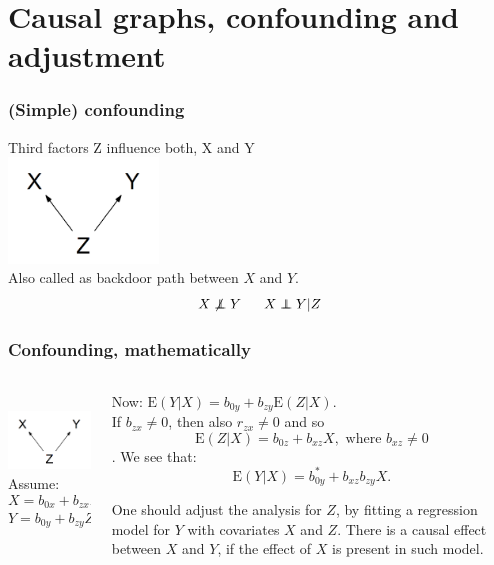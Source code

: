\documentclass[10pt,dvipsnames,t %
,aspectratio=169%
]{beamer}%
\newcommand{\E}{\mathrm{E}}
\newcommand{\indep}{\perp\!\!\!\!\perp}
\begin{document}
\section{Causal graphs, confounding and adjustment}


\begin{frame}
	\frametitle{(Simple) confounding}
	Third factors  Z influence both, X and Y \\
	\includegraphics[width=4cm]{conf1}\\
	Also called as \alert{backdoor path} between $X$ and $Y$. \\
	
$$X \not\indep Y \; \hspace{0.5cm}  X \indep Y|Z$$
	
\end{frame}

\begin{frame}
	\frametitle{Confounding, mathematically}
\begin{columns}
\begin{column}{5cm}
\mbox{ } \\
	\includegraphics[width=4cm]{conf1}
	\mbox{}\\[0.5cm]
Assume:
$$X= b_{0x} + b_{zx}Z + \varepsilon_x, \ \E(\varepsilon_x|Z)=0 $$  
$$ Y= b_{0y} + b_{zy}Z + \varepsilon_y, \ \E(\varepsilon_y|Z, X)=0. $$
\end{column}
\begin{column}{7cm}
Now: 
$\E(Y|X) = b_{0y} + b_{zy}\E(Z|X). $ \\[0.2cm]
If  $b_{zx} \ne 0$, then also  $r_{zx} \ne 0$ and so 
$$ \E(Z|X) =  b_{0z}+ b_{xz}X, \mbox{ where }b_{xz} \ne 0$$. 
We see that:
$$\E(Y|X) = b_{0y}^* + b_{xz}b_{zy}X. $$

\begin{block}{}\alert{One should adjust the analysis for $Z$, by fitting a regression model for $Y$ with covariates
	$X$  and $Z$.} 
There is a causal effect between $X$ and $Y$, if the effect of $X$ is present in such model. \end{block}
\end{column}
\end{columns}
\end{frame}
\end{document}
